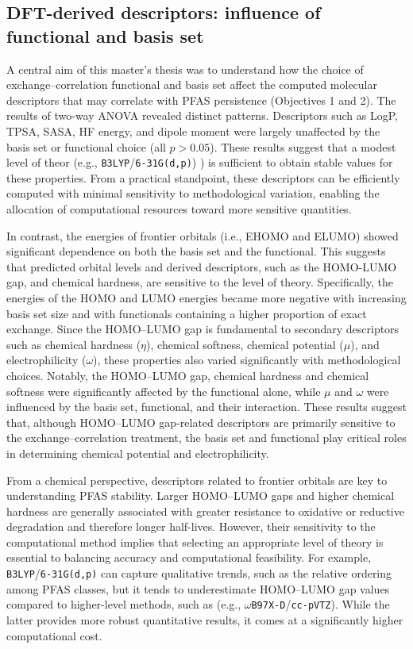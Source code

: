 \subsection{DFT-derived descriptors: influence of functional and basis set}

A central aim of this master’s thesis was to understand how the choice of exchange–correlation functional and basis set affect the computed molecular descriptors that may correlate with PFAS persistence (Objectives 1 and 2). The results of two-way ANOVA revealed distinct patterns. Descriptors such as LogP, TPSA, SASA, HF energy, and dipole moment were largely unaffected by the basis set or functional choice (all \(p>0.05\)). These results suggest that a modest level of theor (e.g., \texttt{B3LYP}/\texttt{6-31G(d,p)}) ) is sufficient to obtain stable values for these properties. From a practical standpoint, these descriptors can be efficiently computed with minimal sensitivity to methodological variation, enabling the allocation of computational resources toward more sensitive quantities.

In contrast, the energies of frontier orbitals (i.e., EHOMO and ELUMO) showed significant dependence on both the basis set and the functional. This suggests that predicted orbital levels and derived descriptors, such as the HOMO-LUMO gap, and chemical hardness, are sensitive to the level of theory. Specifically, the energies of the HOMO and LUMO energies became more negative with increasing basis set size and with functionals containing a higher proportion of exact exchange. Since the HOMO–LUMO gap is fundamental to secondary descriptors such as chemical hardness (\(\eta\)), chemical softness, chemical potential (\(\mu\)), and electrophilicity (\(\omega\)), these properties also varied significantly with methodological choices. Notably, the HOMO–LUMO gap, chemical hardness and chemical softness were significantly affected by the functional alone, while \(\mu\) and \(\omega\) were influenced by the basis set, functional, and their interaction. These results suggest that, although HOMO–LUMO gap-related descriptors are primarily sensitive to the exchange–correlation treatment, the basis set and functional play critical roles in determining chemical potential and electrophilicity. 

From a chemical perspective, descriptors related to frontier orbitals are key to understanding PFAS stability. Larger HOMO–LUMO gaps and higher chemical hardness are generally associated with greater resistance to oxidative or reductive degradation and therefore longer half-lives. However, their sensitivity to the computational method implies that selecting an appropriate level of theory is essential to balancing accuracy and computational feasibility. For example, \texttt{B3LYP}/\texttt{6-31G(d,p)} can capture qualitative trends, such as the relative ordering among PFAS classes, but it tends to underestimate HOMO–LUMO gap values compared to higher-level methods, such as (e.g., \texttt{\(\omega\)B97X-D}/\texttt{cc-pVTZ}). While the latter provides more robust quantitative results, it comes at a significantly higher computational cost. 


